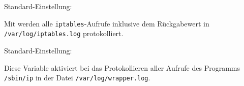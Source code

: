 \begin{description}
    
    Standard-Einstellung: 
    
    Mit  werden alle \texttt{iptables}-Aufrufe
    inklusive dem Rückgabewert in \texttt{/var/log/iptables.log} protokolliert.

    
    Standard-Einstellung: 
    
    Diese Variable aktiviert bei  das Protokollieren aller
    Aufrufe des Programms \texttt{/sbin/ip} in der Datei
    \texttt{/var/log/wrapper.log}.

\end{description}
